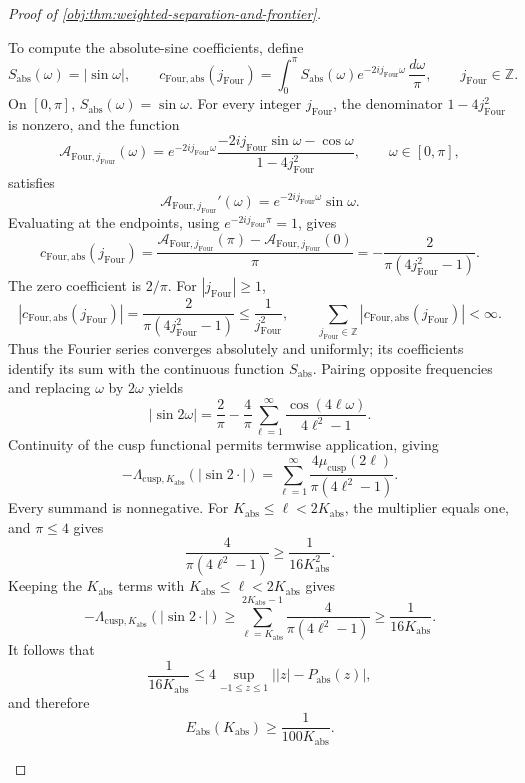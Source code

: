 \documentclass[11pt]{article}
\begin{document}
\begin{proof}[Proof of \cref{obj:thm:weighted-separation-and-frontier}]
\begin{enumerate}
To compute the absolute-sine coefficients, define
\[
S_{\mathrm{abs}}(\omega)=|\sin\omega|,
\qquad
c_{\mathrm{Four},\mathrm{abs}}(j_{\mathrm{Four}})
=\int_0^\pi S_{\mathrm{abs}}(\omega)e^{-2ij_{\mathrm{Four}}\omega}
 \,\frac{d\omega}{\pi},
\qquad j_{\mathrm{Four}}\in\mathbb Z.
\]
On \([0,\pi]\), \(S_{\mathrm{abs}}(\omega)=\sin\omega\). For every integer
\(j_{\mathrm{Four}}\), the denominator \(1-4j_{\mathrm{Four}}^2\) is nonzero, and the function
\[
\mathcal A_{\mathrm{Four},j_{\mathrm{Four}}}(\omega)
=e^{-2ij_{\mathrm{Four}}\omega}
\frac{-2ij_{\mathrm{Four}}\sin\omega-\cos\omega}
 {1-4j_{\mathrm{Four}}^2},
\qquad \omega\in[0,\pi],
\]
satisfies
\[
\mathcal A_{\mathrm{Four},j_{\mathrm{Four}}}'(\omega)
=e^{-2ij_{\mathrm{Four}}\omega}\sin\omega.
\]
Evaluating at the endpoints, using
\(e^{-2ij_{\mathrm{Four}}\pi}=1\), gives
\[
c_{\mathrm{Four},\mathrm{abs}}(j_{\mathrm{Four}})
=\frac{\mathcal A_{\mathrm{Four},j_{\mathrm{Four}}}(\pi)
 -\mathcal A_{\mathrm{Four},j_{\mathrm{Four}}}(0)}{\pi}
=-\frac2{\pi(4j_{\mathrm{Four}}^2-1)}.
\]
The zero coefficient is \(2/\pi\). For \(|j_{\mathrm{Four}}|\ge1\),
\[
|c_{\mathrm{Four},\mathrm{abs}}(j_{\mathrm{Four}})|
=\frac2{\pi(4j_{\mathrm{Four}}^2-1)}
\le\frac1{j_{\mathrm{Four}}^2},
\qquad
\sum_{j_{\mathrm{Four}}\in\mathbb Z}
 |c_{\mathrm{Four},\mathrm{abs}}(j_{\mathrm{Four}})|<\infty.
\]
Thus the Fourier series converges absolutely and uniformly; its coefficients identify its sum with the continuous function \(S_{\mathrm{abs}}\). Pairing opposite frequencies and replacing \(\omega\) by \(2\omega\) yields
\[
|\sin2\omega|
=\frac2\pi-\frac4\pi
 \sum_{\ell=1}^\infty\frac{\cos(4\ell\omega)}{4\ell^2-1}.
\]
Continuity of the cusp functional permits termwise application, giving
\[
-\Lambda_{\mathrm{cusp},K_{\mathrm{abs}}}(|\sin2\cdot|)
=\sum_{\ell=1}^\infty
 \frac{4\mu_{\mathrm{cusp}}(2\ell)}{\pi(4\ell^2-1)}.
\]
Every summand is nonnegative. For
\(K_{\mathrm{abs}}\le\ell<2K_{\mathrm{abs}}\), the multiplier equals one, and \(\pi\le4\) gives
\[
\frac4{\pi(4\ell^2-1)}\ge\frac1{16K_{\mathrm{abs}}^2}.
\] Keeping the
\(K_{\mathrm{abs}}\) terms with
\(K_{\mathrm{abs}}\le\ell<2K_{\mathrm{abs}}\) gives
\[
-\Lambda_{\mathrm{cusp},K_{\mathrm{abs}}}(|\sin2\cdot|)
\ge
\sum_{\ell=K_{\mathrm{abs}}}^{2K_{\mathrm{abs}}-1}
\frac4{\pi(4\ell^2-1)}
\ge\frac1{16K_{\mathrm{abs}}}.
\]
It follows that
\[
\frac1{16K_{\mathrm{abs}}}
\le
4\sup_{-1\le z\le1}\bigl||z|-P_{\mathrm{abs}}(z)\bigr|,
\]
and therefore
\[
E_{\mathrm{abs}}(K_{\mathrm{abs}})
\ge\frac1{100K_{\mathrm{abs}}}.
\]


\end{enumerate}
\end{proof}
\end{document}
